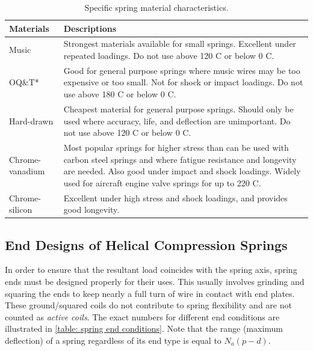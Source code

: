 \documentclass[
10pt,
a4paper,
openany,
svgnames,
]{book}
\begin{document}
\begin{table}[h]
  \centering
  \caption{Specific spring material characteristics.} \label{table: spring material properties}
    \begin{tabular}{ L{3cm} L{10cm}}
      \toprule
      Materials & Descriptions  \\
      \midrule
      Music & Strongest materials available for small springs. Excellent under repeated loadings. Do not use above 120 C or below 0 C. \\
      \midrule
      OQ\&T* & Good for general purpose springs where music wires may be too expensive or too small. Not for shock or impact loadings. Do not use above 180 C or below 0 C. \\
      \midrule
      Hard-drawn & Cheapest material for general purpose springs. Should only be used where accuracy, life, and deflection are unimportant. Do not use above 120 C or below 0 C. \\
      \midrule
      Chrome-vanadium & Most popular springs for higher stress than can be used with carbon steel springs and where fatigue resistance and longevity are needed. Also good under impact and shock loadings. Widely used for aircraft engine valve springs for up to 220 C. \\
      \midrule
      Chrome-silicon & Excellent under high stress and shock loadings, and provides good longevity. \\
      \bottomrule
    \end{tabular}
  \end{table}

\subsection{End Designs of Helical Compression Springs}

In order to ensure that the resultant load coincides with the spring axis, spring ends must be designed properly for their uses. This usually involves grinding and squaring the ends to keep nearly a full turn of wire in contact with end plates. These ground/squared coils do not contribute to spring flexibility and are not counted as \emph{active coils}. The exact numbers for different end conditions are illustrated in \cref{table: spring end conditions}. Note that the range (maximum deflection) of a spring regardless of its end type is equal to $N_a(p - d)$.
\end{document}
